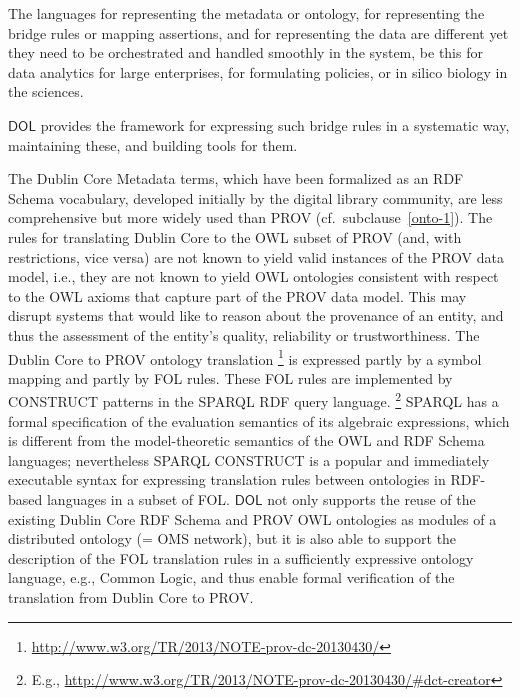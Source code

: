 \documentclass[10pt, a4paper]{isov2}
\newcommand*{\DOL}{\ensuremath{\mathsf{DOL}}\xspace}
\begin{document}
The languages for representing the metadata or ontology, for representing the bridge rules or mapping assertions, and for representing the data are different yet
they need to be orchestrated and handled smoothly in the system, be this for data analytics for large enterprises, for formulating policies, or in silico biology in the
sciences.

\DOL  provides the framework for expressing such bridge rules in a systematic way, maintaining these, and building tools for them.


The Dublin Core Metadata terms, which have been formalized as an RDF Schema vocabulary, developed initially by the digital library community, are less
comprehensive but more widely used than PROV (cf.\ subclause~\ref{onto-1}). The rules for translating Dublin Core to the OWL subset of PROV (and, with restrictions,
vice versa) are not known to yield valid instances of the PROV data model, i.e., they are not known to yield OWL ontologies consistent with respect to the OWL axioms that
capture part of the PROV data model. This may disrupt systems that would like to reason about the provenance of an entity, and thus the assessment of the
entity's quality, reliability or trustworthiness.
The Dublin Core to PROV ontology translation%
\footnote{\url{http://www.w3.org/TR/2013/NOTE-prov-dc-20130430/}}
  is expressed partly by a symbol mapping and partly by FOL rules. These FOL rules are implemented by CONSTRUCT patterns in the SPARQL RDF query language.%
\footnote{E.g., \url{http://www.w3.org/TR/2013/NOTE-prov-dc-20130430/\#dct-creator}}
SPARQL has a formal specification of the evaluation semantics of its algebraic expressions, which
 is different from the model-theoretic semantics of the OWL and RDF Schema languages; nevertheless
SPARQL CONSTRUCT is a popular and immediately executable syntax for expressing translation rules
 between ontologies in RDF-based languages in a subset of FOL.
\DOL  not only supports the reuse of the existing Dublin Core RDF Schema and PROV OWL ontologies as
 modules of a distributed ontology (= OMS network), but it is also able to support the description
of the FOL translation rules in a sufficiently expressive ontology language, e.g., Common Logic,
and thus enable formal verification of the translation from Dublin Core to PROV.
\end{document}
